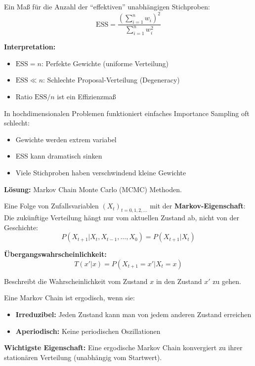 Ein Maß für die Anzahl der ``effektiven'' unabhängigen Stichproben:
$$\text{ESS} = \frac{\left(\sum_{i=1}^{n} w_i\right)^2}{\sum_{i=1}^{n} w_i^2}$$

\textbf{Interpretation:}
\begin{itemize}[leftmargin=1.5em]
    \item $\text{ESS} = n$: Perfekte Gewichte (uniforme Verteilung)
    \item $\text{ESS} \ll n$: Schlechte Proposal-Verteilung (Degeneracy)
    \item Ratio $\text{ESS}/n$ ist ein Effizienzmaß
\end{itemize}

In hochdimensionalen Problemen funktioniert einfaches Importance Sampling oft schlecht:
\begin{itemize}[leftmargin=1.5em]
    \item Gewichte werden extrem variabel
    \item ESS kann dramatisch sinken
    \item Viele Stichproben haben verschwindend kleine Gewichte
\end{itemize}

\textbf{Lösung:} Markov Chain Monte Carlo (MCMC) Methoden.

Eine Folge von Zufallsvariablen $(X_t)_{t=0,1,2,\ldots}$ mit der \textbf{Markov-Eigenschaft}: Die zukünftige Verteilung hängt nur vom aktuellen Zustand ab, nicht von der Geschichte:
$$P(X_{t+1} | X_t, X_{t-1}, \ldots, X_0) = P(X_{t+1} | X_t)$$

\textbf{Übergangswahrscheinlichkeit:}
$$T(x' | x) = P(X_{t+1} = x' | X_t = x)$$

Beschreibt die Wahrscheinlichkeit vom Zustand $x$ in den Zustand $x'$ zu gehen.

Eine Markov Chain ist ergodisch, wenn sie:
\begin{itemize}[leftmargin=1.5em]
    \item \textbf{Irreduzibel:} Jeden Zustand kann man von jedem anderen Zustand erreichen
    \item \textbf{Aperiodisch:} Keine periodischen Oszillationen
\end{itemize}

\textbf{Wichtigste Eigenschaft:} Eine ergodische Markov Chain konvergiert zu ihrer stationären Verteilung (unabhängig vom Startwert).

